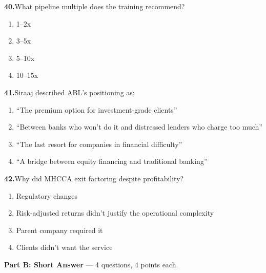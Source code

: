 \documentclass[11pt,letterpaper]{article}
\newif\ifshowsolutions
\newcommand{\answer}[1]{%
  \ifshowsolutions
    \begin{tcolorbox}[colback=green!5!white, colframe=answergreen, title={\small\textbf{Answer}}, fonttitle=\color{white}, coltitle=white, colbacktitle=answergreen, boxrule=0.5pt, arc=2pt, left=4pt, right=4pt, top=2pt, bottom=2pt]
    {\small #1}
    \end{tcolorbox}
  \fi
}
\begin{document}
\vspace{0.5em}

\noindent\textbf{40.}\quad What pipeline multiple does the training recommend?

\begin{enumerate}[label=\Alph*), leftmargin=2em, itemsep=0pt]
\item 1--2x
\item 3--5x
\item 5--10x
\item 10--15x
\end{enumerate}
\answer{B) 3--5x. If target is \$10M, pipeline should be \$30--50M.}

\vspace{0.5em}

\noindent\textbf{41.}\quad Siraaj described ABL's positioning as:

\begin{enumerate}[label=\Alph*), leftmargin=2em, itemsep=0pt]
\item ``The premium option for investment-grade clients''
\item ``Between banks who won't do it and distressed lenders who charge too much''
\item ``The last resort for companies in financial difficulty''
\item ``A bridge between equity financing and traditional banking''
\end{enumerate}
\answer{B) ABL fills a gap: banks find it too complex, distressed lenders charge too much. MHCCA offers a middle ground.}

\vspace{0.5em}

\noindent\textbf{42.}\quad Why did MHCCA exit factoring despite profitability?

\begin{enumerate}[label=\Alph*), leftmargin=2em, itemsep=0pt]
\item Regulatory changes
\item Risk-adjusted returns didn't justify the operational complexity
\item Parent company required it
\item Clients didn't want the service
\end{enumerate}
\answer{B) Profitable but operationally complex. Risk-adjusted returns didn't justify the effort. Shows strategic discipline.}

\vspace{1em}
\begin{tcolorbox}[colback=blue!3!white, colframe=mhcblue, boxrule=0.5pt, arc=2pt]
\textbf{Part B: Short Answer} --- 4 questions, 4 points each.
\end{tcolorbox}
\end{document}
